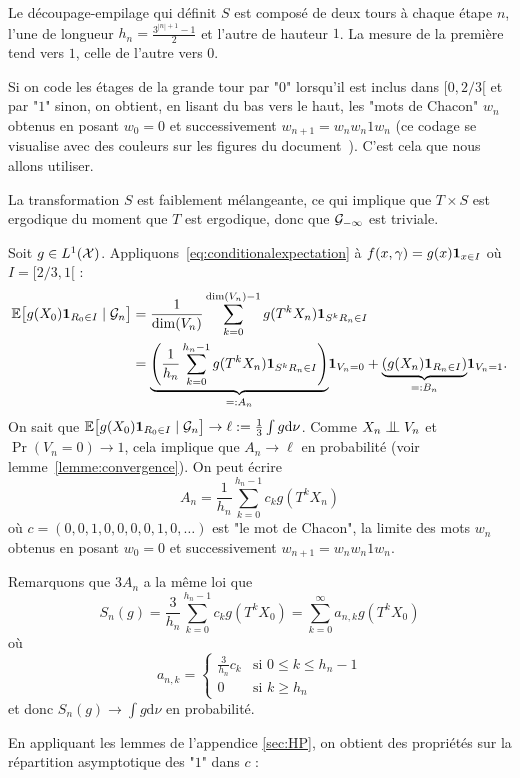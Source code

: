 \documentclass[12pt,a4paper]{article}
\begin{document}
Le découpage-empilage qui définit $S$ est composé de deux tours à chaque étape $n$, 
l'une de longueur $h_n = \frac{3^{|n|+1}-1}{2}$ et l'autre de hauteur $1$.  
La mesure de la première tend vers $1$, celle de l'autre vers $0$. 

Si on code les étages de la grande tour par "$0$" lorsqu'il est inclus dans 
$[0, 2/3[$ et par "$1$" sinon, on obtient, en lisant du bas vers le haut, les 
"mots de Chacon" $w_n$ obtenus en posant $w_0=0$ et successivement 
$w_{n+1} = w_nw_n1w_n$ (ce codage se visualise avec des couleurs sur les figures du document~\cite{AP}). 
C'est cela que nous allons utiliser. 

La transformation $S$ est faiblement mélangeante, ce qui implique que $T \times S$ 
est ergodique du moment que $T$ est ergodique, donc que $\mathcal{G}_{-\infty}$ est triviale. 


Soit $g \in L^1(\mathcal{X})$. 
Appliquons~\eqref{eq:conditionalexpectation} à 
$f(x,\gamma) = g(x)\boldsymbol 1_{x \in I}$ où $I=[2/3, 1[$ :
\begin{align*}
\mathbb{E}\bigl[g(X_0) \boldsymbol 1_{R_0 \in I} \mid \mathcal{G}_n\bigr]
&  = \frac{1}{\dim(V_n)}\sum_{k=0}^{\dim(V_n)-1} g(T^kX_n) \boldsymbol 1_{S^k R_n \in I} \\
& = \underset{=:A_n}{\underbrace{\left(\frac{1}{h_n}\sum_{k=0}^{h_n-1} g(T^kX_n) \boldsymbol 1_{S^k R_n \in I}\right)}}\boldsymbol 1_{V_n=0} 
+ \underset{=:B_n}{\underbrace{\left(g(X_n) \boldsymbol 1_{R_n \in I}\right)}}\boldsymbol 1_{V_n=1}.
\end{align*}
On sait que 
$\mathbb{E}\bigl[g(X_0) \boldsymbol 1_{R_0 \in I} \mid \mathcal{G}_n\bigr] \to \ell:= \frac{1}{3}\int g \mathrm{d}\nu$. 
Comme $X_n \indep V_n$ et $\Pr(V_n=0) \to 1$, cela implique que $A_n \to \ell$ en probabilité 
(voir lemme~\ref{lemme:convergence}). 
On peut écrire
$$
A_n = \frac{1}{h_n}\sum_{k=0}^{h_n-1} c_k g(T^kX_n) 
$$
où $c = (0, 0, 1, 0, 0, 0, 0, 1, 0, \ldots)$ est "le mot de Chacon", 
la limite des mots $w_n$ obtenus en posant $w_0=0$ et successivement 
$w_{n+1} = w_nw_n1w_n$. 


Remarquons que $3A_n$ a la même loi que 
$$
S_n(g) = \frac{3}{h_n}\sum_{k=0}^{h_n-1} c_k g(T^kX_0) 
= \sum_{k=0}^\infty a_{n,k} g(T^kX_0) 
$$ 
où
$$
a_{n,k} = \begin{cases}
\frac{3}{h_n} c_k & \text{si $0 \leq k \leq h_n-1$} \\
0 & \text{si $k \geq h_n$}
\end{cases}
$$
et donc $S_n(g) \to \int g \mathrm{d}\nu$ en probabilité. 


En appliquant les lemmes de l'appendice \ref{sec:HP}, on obtient des 
propriétés sur la répartition asymptotique des "$1$" dans $c$ :
\end{document}
